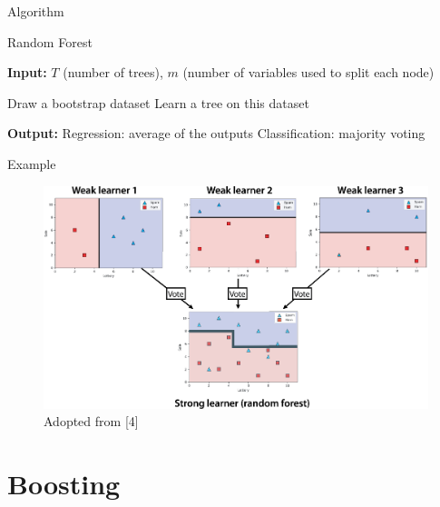 \documentclass[serif, aspectratio=169]{beamer}
\newcommand{\IndState}{\State\hspace{\algorithmicindent}}
\begin{document}
\begin{frame}{Algorithm}
    \begin{algorithm}[H]
    \caption{Random Forest}\label{alg:RF}
    \begin{algorithmic}[1]
        \State \textbf{Input:} $T$ (number of trees), $m$ (number of variables used to split each node)
        
            \State Draw a bootstrap dataset
            \State Learn a tree on this dataset
        \EndFor
        
        \State \textbf{Output:} 
        \IndState Regression: average of the outputs
        \IndState Classification: majority voting
    \end{algorithmic}
    \end{algorithm}
\end{frame}

\begin{frame}{Example}
    \begin{center}
    \begin{figure}[bh]
        \includegraphics[width=\textwidth]{pic/randomforest.png}
        {\scriptsize Adopted from [4]}
    \end{figure}
    \endminipage
    \end{center}
\end{frame}

\section{Boosting}
\end{document}
